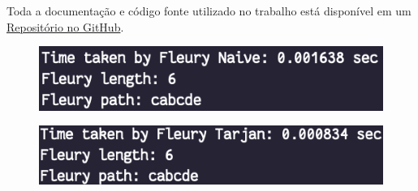 Toda a documentação e código fonte utilizado no trabalho está disponível em um 
\href{https://github.com/joaoaugustoss/Lista-2}{Repositório no GitHub}.

\begin{figure}[H]
\centering
\begin{minipage}{.48\textwidth}
  \centering
    \includegraphics[width=1\linewidth]{Figuras/Fleury_naive.png}
  \label{fig:naive}
\end{minipage}%
\hfill
\vline 
\hfill
\begin{minipage}{.48\textwidth}
  \centering
    \includegraphics[width=1\linewidth]{Figuras/Fleury_tarjan.png}
  \label{fig:tarjan}
\end{minipage}
\end{figure}

\newpage
\nocite{tarjan1974note}
\nocite{SCC}
\nocite{west_introduction_2000}